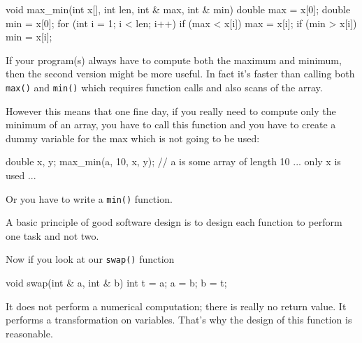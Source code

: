 \begin{consolethree}[escapeinside=||]
void max_min(int x[], int len,
             int & max, int & min)
{
    double max = x[0];
    double min = x[0];
    for (int i = 1; i < len; i++)
    {
        if (max < x[i]) max = x[i];
        if (min > x[i]) min = x[i];
    }
}
\end{consolethree}

If your program(s) always have to compute both the maximum and minimum, then the second version might be more useful. In fact it's faster than calling both \texttt{max()} and \texttt{min()} which requires  function calls and also  scans of the array.

However this means that one fine day, if you really need to compute only the minimum of an array, you have to call this function and you have to create a dummy variable for the max which is not going to be used:

\begin{consolethree}[escapeinside=||]
double x, y;
max_min(a, 10, x, y); // a is some array of length 10
... only x is used ...
\end{consolethree}

Or you have to write a \texttt{min()} function.

A basic principle of good software design is to design each function to perform one task and not two.

Now if you look at our \texttt{swap()} function

\begin{consolethree}[escapeinside=||]
void swap(int & a, int & b)
{
    int t = a;
    a = b;
    b = t;
}
\end{consolethree}

It does not perform a numerical computation; there is really no return value. It performs a transformation on variables. That's why the design of this function is reasonable.



